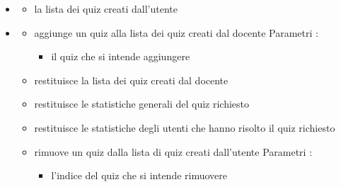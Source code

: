 \begin{itemize}
\item {}
\begin{itemize}
\item {}
\newline
la lista dei quiz creati dall'utente
\end{itemize}
\item {}
\begin{itemize}
\item {}
\newline
aggiunge un quiz alla lista dei quiz creati dal docente
\newline
Parametri :
\begin{itemize}
\item {}
\newline
il quiz che si intende aggiungere
\end{itemize}
\item {}
\newline
restituisce la lista dei quiz creati dal docente
\newline
\item {}
\newline
restituisce le statistiche generali del quiz richiesto
\newline
\item {}
\newline
restituisce le statistiche degli utenti che hanno risolto il quiz richiesto
\newline
\item {}
\newline
rimuove un quiz dalla lista di quiz creati dall'utente
\newline
Parametri :
\begin{itemize}
\item {}
\newline
l'indice del quiz che si intende rimuovere
\end{itemize}
\end{itemize}
\end{itemize}
